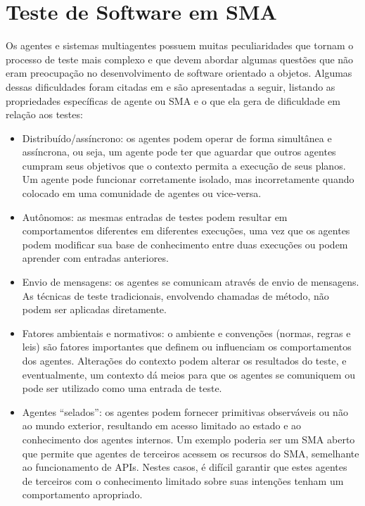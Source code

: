 \section{Teste de Software em SMA} \label{sec:testesma}

Os agentes e sistemas multiagentes possuem muitas peculiaridades que tornam o processo de teste mais complexo e que devem abordar algumas questões que não eram preocupação no desenvolvimento de software orientado a objetos. Algumas dessas dificuldades foram citadas em \cite{rouff2002test,houhamdi2011multi,nguyen2009thesis} e são apresentadas a seguir, listando as propriedades específicas de agente ou SMA e o que ela gera de dificuldade em relação aos testes:

\begin{itemize}
\item Distribuído/assíncrono: os agentes podem operar de forma simultânea e assíncrona, ou seja, um agente pode ter que aguardar que outros agentes cumpram seus objetivos que o contexto permita a execução de seus planos. Um agente pode funcionar corretamente isolado, mas incorretamente quando colocado em uma comunidade de agentes ou vice-versa.
\item Autônomos: as mesmas entradas de testes podem resultar em comportamentos diferentes em diferentes execuções, uma vez que os agentes podem modificar sua base de conhecimento entre duas execuções ou podem aprender com entradas anteriores.
\item Envio de mensagens: os agentes se comunicam através de envio de mensagens. As técnicas de teste tradicionais, envolvendo chamadas de método, não podem ser aplicadas diretamente.
\item Fatores ambientais e normativos: o ambiente e convenções (normas, regras e leis) são fatores importantes que definem ou influenciam os comportamentos dos agentes. Alterações do contexto podem alterar os resultados do teste, e eventualmente, um contexto dá meios para que os agentes se comuniquem ou pode ser utilizado como uma entrada de teste.
\item Agentes “selados”: os agentes podem fornecer primitivas observáveis ou não ao mundo exterior, resultando em acesso limitado ao estado e ao conhecimento dos agentes internos. Um exemplo poderia ser um SMA aberto que permite que agentes de terceiros acessem os recursos do SMA, semelhante ao funcionamento de APIs. Nestes casos, é difícil garantir que estes agentes de terceiros com o conhecimento limitado sobre suas intenções tenham um comportamento apropriado.
\end{itemize}

